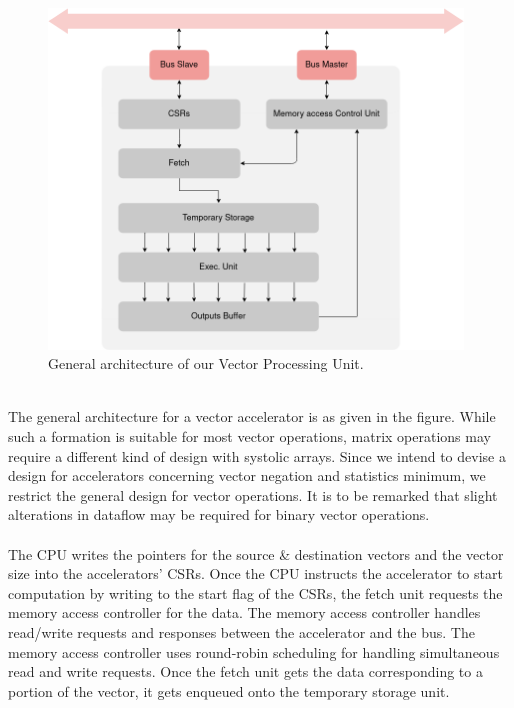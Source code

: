 \begin{paper}
\renewcommand*{\pagemark}{}
\section*{}
\begin{figure}[H]
\centering
\includegraphics[width=11cm]{Images/VectorExtensions.png}
\caption{\content General architecture of our Vector Processing Unit.}
\end{figure}\\
\nointend The general architecture for a vector accelerator is as given in the figure. While such a formation is suitable for most vector operations, matrix operations may require a
different kind of design with systolic arrays. Since we intend to devise a design for accelerators concerning vector negation and statistics minimum, we restrict the general design for vector operations. It is to be remarked that slight alterations in dataflow may be required for binary vector operations.\\\\
\nointend The CPU writes the pointers for the source & destination vectors and the vector size into the accelerators' CSRs. Once the CPU instructs the accelerator to start computation by writing to the start flag of the CSRs, the fetch unit requests the memory access controller for the data. The memory access controller handles read/write requests and responses between the accelerator and the bus. The memory access controller uses round-robin scheduling for handling simultaneous read and write requests. Once the fetch unit gets the data corresponding to a portion of the vector, it gets enqueued onto the temporary storage unit.

\end{paper}